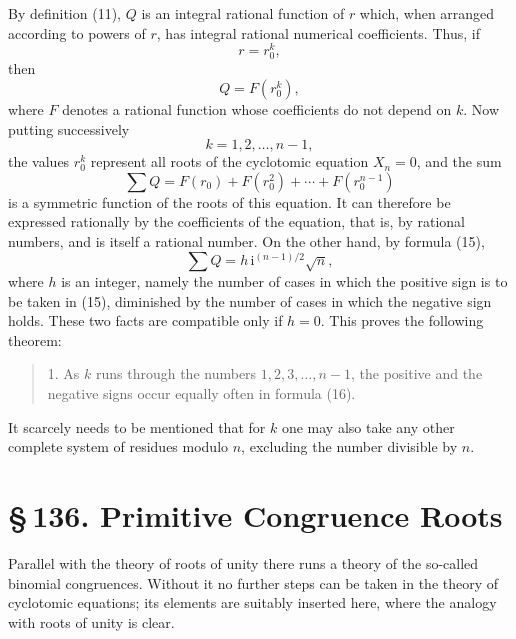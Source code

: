 \documentclass[11pt]{article}
\providecommand{\sect}[2]{\section*{\S\,#1. #2}}
\providecommand{\ii}{\mathrm{i}}
\begin{document}
By definition (11), $Q$ is an integral rational function of $r$ which, when arranged according to powers of $r$, has integral rational numerical coefficients. Thus, if
\[
        r=r_0^k,
\]
then
\[
        Q=F(r_0^k),
\]
where $F$ denotes a rational function whose coefficients do not depend on $k$. Now putting successively
\[
        k=1,2,\ldots,n-1,
\]
the values $r_0^k$ represent all roots of the cyclotomic equation $X_n=0$, and the sum
\[
        \sum Q=F(r_0)+F(r_0^2)+\cdots+F(r_0^{n-1})
\]
is a symmetric function of the roots of this equation. It can therefore be expressed rationally by the coefficients of the equation, that is, by rational numbers, and is itself a rational number. On the other hand, by formula (15),
\[
        \sum Q=h\,\ii^{(n-1)/2}\sqrt n,
\]
where $h$ is an integer, namely the number of cases in which the positive sign is to be taken in (15), diminished by the number of cases in which the negative sign holds. These two facts are compatible only if $h=0$. This proves the following theorem:
\begin{quote}
1. As $k$ runs through the numbers $1,2,3,\ldots,n-1$, the positive and the negative signs occur equally often in formula (16).
\end{quote}
It scarcely needs to be mentioned that for $k$ one may also take any other complete system of residues modulo $n$, excluding the number divisible by $n$.

\sect{136}{Primitive Congruence Roots}

Parallel with the theory of roots of unity there runs a theory of the so-called binomial congruences. Without it no further steps can be taken in the theory of cyclotomic equations; its elements are suitably inserted here, where the analogy with roots of unity is clear.
\end{document}
